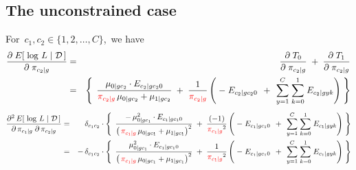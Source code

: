 
\vskip 0.5cm
\subsection{The unconstrained case}
For \,$c_{1}, c_{2} \in \{1,2,\ldots,C\}$,\, we have
\begin{eqnarray*}
\dfrac{\partial\;E\!\left[\,\left.\log\,L\;\right\vert\,\mathcal{D}\,\right]}{\partial\;\pi_{c_{2} \vert g}}
&=& \dfrac{\partial\;T_{0}}{\partial\;\pi_{c_{2} \vert g}} \;+\; \dfrac{\partial\;T_{1}}{\partial\;\pi_{c_{2} \vert g}}
\\
&=&
	\left\{\;\,
		\dfrac{\mu_{0 \vert gc_{2}}\cdot E_{c_{2} \vert gc_{2}0}}{{\color{red}\pi_{c_{2} \vert g}}\,\mu_{0 \vert gc_{2}} + \mu_{1\vert gc_{2}}}
		\;+\;
		\dfrac{1}{{\color{red}\pi_{c_{2} \vert g}}}
		\left(
			\;-\;E_{c_{2} \vert gc_{2}0}
			\,\;+\;\,
			\overset{C}{\underset{y=1}{\sum}} \; \overset{1}{\underset{k=0}{\sum}} \; E_{c_{2} \vert gyk}
		\right)
	\;\right\}
\end{eqnarray*}
\begin{eqnarray*}
\dfrac{\partial^{2}\,E\!\left[\,\left.\log\,L\;\right\vert\,\mathcal{D}\,\right]}{\partial\,\pi_{c_{1} \vert g}\;\partial\,\pi_{c_{2} \vert g}}
&=&
	\delta_{c_{1}c_{2}}
	\cdot
	\left\{\;\,
		\dfrac{
			-\,\mu_{0 \vert gc_{1}}^{2}\cdot E_{c_{1} \vert gc_{1}0}
			}{
			\left(\,{\color{red}\pi_{c_{1} \vert g}}\,\mu_{0 \vert gc_{1}} + \mu_{1\vert gc_{1}}\right)^{2}
			}
		\;+\;
		\dfrac{(-1)}{{\color{red}\pi_{c_{1} \vert g}}^{2}}
		\left(
			\;-\;E_{c_{1} \vert gc_{1}0}
			\,\;+\;\,
			\overset{C}{\underset{y=1}{\sum}} \; \overset{1}{\underset{k=0}{\sum}} \; E_{c_{1} \vert gyk}
		\right)
	\;\right\}
\\
&=&
	-\,\delta_{c_{1}c_{2}}
	\cdot
	\left\{\;\,
		\dfrac{
			\mu_{0 \vert gc_{1}}^{2}\cdot E_{c_{1} \vert gc_{1}0}
			}{
			\left(\,{\color{red}\pi_{c_{1} \vert g}}\,\mu_{0 \vert gc_{1}} + \mu_{1\vert gc_{1}}\right)^{2}
			}
		\;+\;
		\dfrac{1}{{\color{red}\pi_{c_{1} \vert g}}^{2}}
		\left(
			\;-\;E_{c_{1} \vert gc_{1}0}
			\,\;+\;\,
			\overset{C}{\underset{y=1}{\sum}} \; \overset{1}{\underset{k=0}{\sum}} \; E_{c_{1} \vert gyk}
		\right)
	\;\right\}
\end{eqnarray*}

